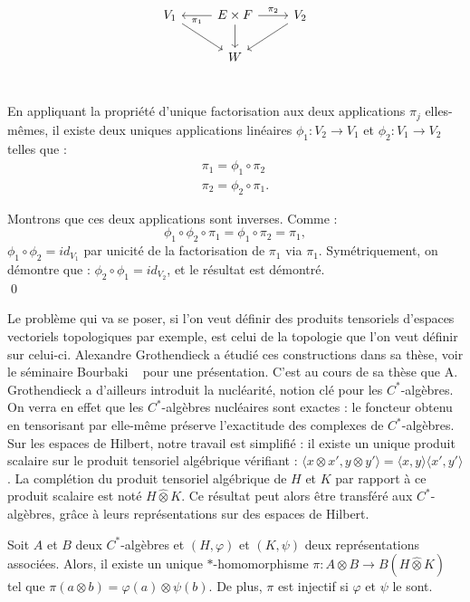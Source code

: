 \[\begin{tikzcd}
V_1 \arrow{dr}& \arrow{l}{\pi_1}	E\times F \arrow{d}\arrow{r}{\pi_2}	& \arrow{dl}V_2 \\
			 & 		W		&	\\
\end{tikzcd}\]

\begin{dem}
En appliquant la propriété d'unique factorisation aux deux applications $\pi_j$ elles-mêmes, il existe deux uniques applications linéaires $\phi_1 : V_2\rightarrow V_1$ et $\phi_2 : V_1\rightarrow V_2$ telles que :
\[\begin{array}{c}\pi_1=\phi_1\circ \pi_2 \\ \pi_2=\phi_2\circ \pi_1.\end{array}\]

Montrons que ces deux applications sont inverses. Comme :
\[\phi_1\circ \phi_2 \circ \pi_1 = \phi_1\circ \pi_2 =\pi_1 ,\]
$\phi_1\circ \phi_2 = id_{V_1}$ par unicité de la factorisation de $\pi_1$ via $\pi_1$.
Symétriquement, on démontre que : $\phi_2\circ \phi_1 = id_{V_2}$, et le résultat est démontré.\\
\qed
\end{dem}

Le problème qui va se poser, si l'on veut définir des produits tensoriels d'espaces vectoriels topologiques par exemple, est celui de la topologie que l'on veut définir sur celui-ci. Alexandre Grothendieck a étudié ces constructions dans sa thèse, voir le séminaire Bourbaki ~\cite{GrothendieckNuc} pour une présentation. C'est au cours de sa thèse que A. Grothendieck a d'ailleurs introduit la nucléarité, notion clé pour les $C^*$-algèbres. On verra en effet que les $C^*$-algèbres nucléaires sont exactes : le foncteur obtenu en tensorisant par elle-même préserve l'exactitude des complexes de $C^*$-algèbres.\\

Sur les espaces de Hilbert, notre travail est simplifié : il existe un unique produit scalaire sur le produit tensoriel algébrique vérifiant : $\langle x\otimes x', y\otimes y'\rangle=\langle x, y\rangle \langle x',y' \rangle$. La complétion du produit tensoriel algébrique de $H$ et $K$ par rapport à ce produit scalaire est noté $H\hat \otimes K$. Ce résultat peut alors être transféré aux $C^*$-algèbres, grâce à leurs représentations sur des espaces de Hilbert. 

\begin{prop}
Soit $A$ et $B$ deux $C^*$-algèbres et $(H,\varphi)$ et $(K,\psi)$ deux représentations associées. Alors, il existe un unique $*$-homomorphisme $\pi : A\otimes B \rightarrow B(H\hat\otimes K)$ tel que $\pi(a\otimes b)= \varphi(a)\otimes \psi(b)$. De plus, $\pi$ est injectif si $\varphi$ et $\psi$ le sont.
\end{prop} 

